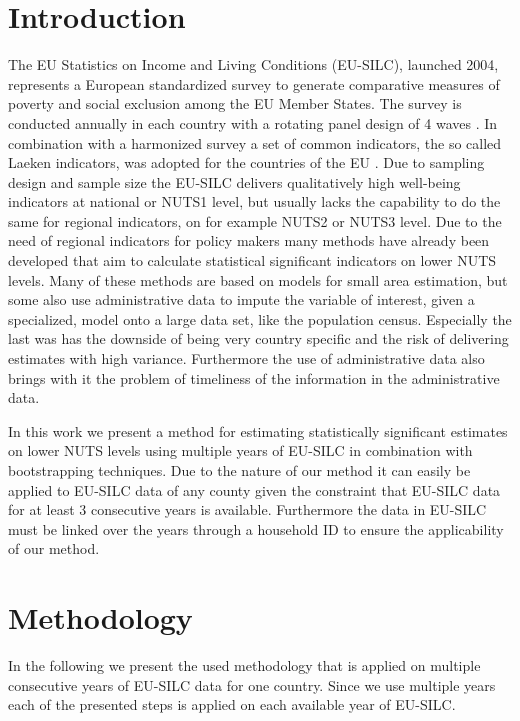 \documentclass{scrartcl}
\begin{document}


\section{Introduction}

The EU Statistics on Income and Living Conditions (EU-SILC), launched 2004, represents a European standardized survey to generate comparative measures of poverty and social exclusion among the EU Member States. The survey is conducted annually in each country with a rotating panel design of 4 waves \citep[see][]{vebe2006}. In combination with a harmonized survey a set of common indicators, the so called Laeken indicators, was adopted for the countries of the EU \citep[see][]{atkinson2002}.
\newline
Due to sampling design and sample size the EU-SILC delivers qualitatively high well-being indicators at national or NUTS1 level, but usually lacks the capability to do the same for regional indicators, on for example NUTS2 or NUTS3 level. Due to the need of regional indicators for policy makers many methods have already been developed that aim to calculate statistical significant indicators on lower NUTS levels.\citep{gigaleva2012,povmap}
Many of these methods are based on models for small area estimation, but some also use administrative data to impute the variable of interest, given a specialized, model onto a large data set, like the population census. Especially the last was has the downside of being very country specific and the risk of delivering estimates with high variance. Furthermore the use of administrative data also brings with it the problem of timeliness of the information in the administrative data.

In this work we present a method for estimating statistically significant estimates on lower NUTS levels using multiple years of EU-SILC in combination with bootstrapping techniques. Due to the nature of our method it can easily be applied to EU-SILC data of any county given the constraint that EU-SILC data for at least 3 consecutive years is available. Furthermore the data in EU-SILC must be linked over the years through a household ID to ensure the applicability of our method.

\section{Methodology}
In the following we present the used methodology that is applied on multiple consecutive years of EU-SILC data for one country. Since we use multiple years each of the presented steps is applied on each available year of EU-SILC.
\end{document}
